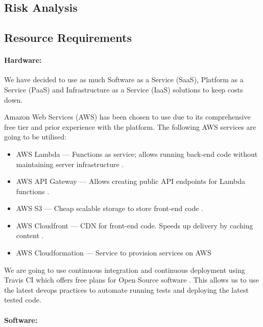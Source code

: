 \documentclass[a4paper,11pt]{article}
\begin{document}
\subsection{Risk Analysis}



\subsection{Resource Requirements}

\paragraph{Hardware:}

We have decided to use as much Software as a Service (SaaS), Platform as a
Service (PaaS) and Infrastructure as a Service (IaaS) solutions to keep costs
down.

Amazon Web Services (AWS) has been chosen to use due to its comprehensive free
tier and prior experience with the platform. The following AWS services are
going to be utilised:

\begin{itemize}
  \item AWS Lambda --- Functions as service; allows running back-end code
    without maintaining server infrastructure \autocite{aws:2}.
  \item AWS API Gateway --- Allows creating public API endpoints for Lambda
    functions \autocite{aws:3}.
  \item AWS S3 --- Cheap scalable storage to store front-end code
    \autocite{aws:4}.
  \item AWS Cloudfront --- CDN for front-end code. Speeds up delivery by caching
    content \autocite{aws:5}.
  \item AWS Cloudformation --- Service to provision services on AWS
    \autocite{aws:6}
\end{itemize}

We are going to use continuous integration and continuous deployment using
Travis CI which offers free plans for Open Source software \autocite{trci:7}. This allows us to use
the latest devops practices to automate running tests and deploying the latest
tested code.

\paragraph{Software:}
\end{document}
